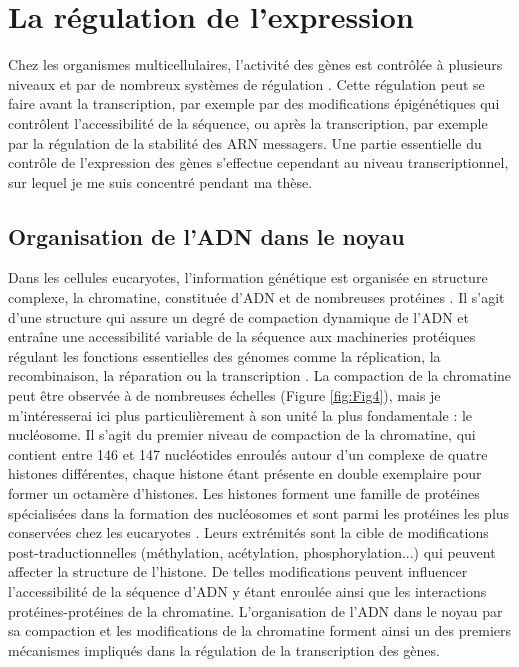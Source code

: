 \chapter{La régulation de l’expression}
{\hypersetup{linkcolor=GREYDARK}\minitoc}
\label{chap:regulation-de-expression}

Chez les organismes multicellulaires, l’activité des gènes est contrôlée à plusieurs niveaux et par de nombreux systèmes de régulation \citep{maston_transcriptional_2006}. Cette régulation peut se faire avant la transcription, par exemple par des modifications épigénétiques qui contrôlent l’accessibilité de la séquence, ou après la transcription, par exemple par la régulation de la stabilité des \acrshort{ARN} messagers. Une partie essentielle du contrôle de l’expression des gènes s’effectue cependant au niveau transcriptionnel, sur lequel je me suis concentré pendant ma thèse.

\section{Organisation de l’ADN dans le noyau}
\label{sec:organisation-ADN}

Dans les cellules eucaryotes, l’information génétique est organisée en structure complexe, la chromatine, constituée d'\acrshort{ADN} et de nombreuses protéines \citep{kornberg_chromatin_1992}. Il s’agit d’une structure qui assure un degré de compaction dynamique de l’ADN et entraîne une accessibilité variable de la séquence aux machineries protéiques régulant les fonctions essentielles des génomes comme la réplication, la recombinaison, la réparation ou la transcription \citep{felsenfeld_controlling_2003}. La compaction de la chromatine peut être observée à de nombreuses échelles (Figure \ref{fig:Fig4}), mais je m’intéresserai ici plus particulièrement à son unité la plus fondamentale : le nucléosome. Il s’agit du premier niveau de compaction de la chromatine, qui contient entre 146 et 147 nucléotides enroulés autour d’un complexe de quatre histones différentes, chaque histone étant présente en double exemplaire pour former un octamère d’histones. Les histones forment une famille de protéines spécialisées dans la formation des nucléosomes et sont parmi les protéines les plus conservées chez les eucaryotes \citep{sandman_diversity_1998}. Leurs extrémités sont la cible de modifications post-traductionnelles (méthylation, acétylation, phosphorylation...) qui peuvent affecter la structure de l’histone. De telles modifications peuvent influencer l’accessibilité de la séquence d’ADN y étant enroulée ainsi que les interactions protéines-protéines de la chromatine. L’organisation de l’ADN dans le noyau par sa compaction et les modifications de la chromatine forment ainsi un des premiers mécanismes impliqués dans la régulation de la transcription des gènes.

